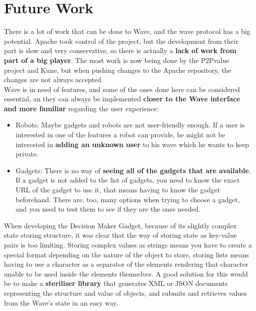 \section{Future Work}
There is a lot of work that can be done to Wave, and the wave protocol has a big potential. Apache took control of the project, but the development from their part is slow and very conservative, so there is actually a \textbf{lack of work from part of a big player}. The most work is now being done by the P2Pvalue project and Kune, but when pushing changes to the Apache repository, the changes are not always accepted.\\[.2cm]
Wave is in need of features, and some of the ones done here can be considered essential, an they can always be implemented \textbf{closer to the Wave interface and more familiar} regarding the user experience:
\begin{itemize}
  \item Robots: Maybe gadgets and robots are not user-friendly enough. If a user is interested in one of the features a robot can provide, he might not be interested in \textbf{adding an unknown user} to his wave which he wants to keep private.
  \item Gadgets: There is no way of \textbf{seeing all of the gadgets that are available}. If a gadget is not added to the list of gadgets, you need to know the exact URL of the gadget to use it, that means having to know the gadget beforehand. There are, too, many options when trying to choose a gadget, and you need to test them to see if they are the ones needed.
\end{itemize}
When developing the Decision Maker Gadget, because of its slightly complex state storing structure, it was clear that the way of storing state as key-value pairs is too limiting. Storing complex values as strings means you have to create a special format depending on the nature of the object to store, storing lists means having to use a character as a separator of the elements rendering that character unable to be used inside the elements themselves. A good solution for this would be to make a \textbf{steriliser library} that generates XML or JSON documents representing the structure and value of objects, and submits and retrieves values from the  Wave's state in an easy way.


\rhead{}
\renewcommand{\headrulewidth}{0pt}
